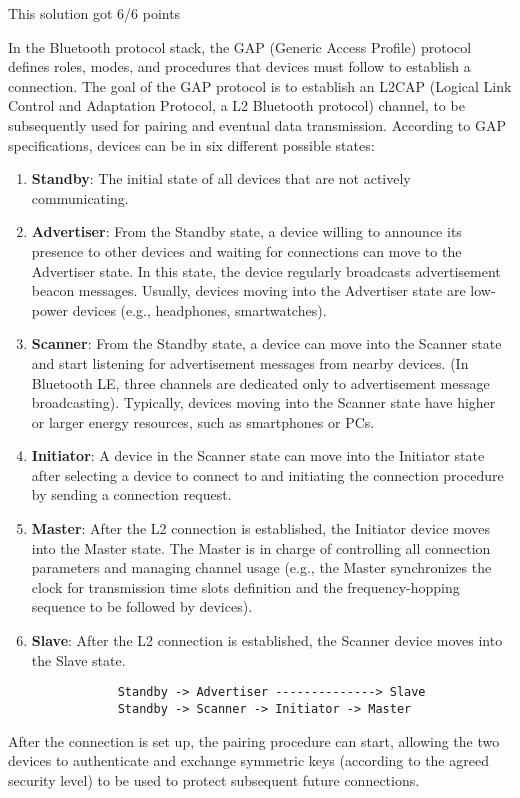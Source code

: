 \begin{solution}
    This solution got 6/6 points

    In the Bluetooth protocol stack, the GAP (Generic Access Profile) protocol defines roles, modes, and procedures that devices must follow to establish a connection. The goal of the GAP protocol is to establish an L2CAP (Logical Link Control and Adaptation Protocol, a L2 Bluetooth protocol) channel, to be subsequently used for pairing and eventual data transmission. According to GAP specifications, devices can be in six different possible states:
    \begin{enumerate}
        \item \textbf{Standby}: The initial state of all devices that are not actively communicating.
        \item \textbf{Advertiser}: From the Standby state, a device willing to announce its presence to other devices and waiting for connections can move to the Advertiser state. In this state, the device regularly broadcasts advertisement beacon messages. Usually, devices moving into the Advertiser state are low-power devices (e.g., headphones, smartwatches).
        \item \textbf{Scanner}: From the Standby state, a device can move into the Scanner state and start listening for advertisement messages from nearby devices. (In Bluetooth LE, three channels are dedicated only to advertisement message broadcasting). Typically, devices moving into the Scanner state have higher or larger energy resources, such as smartphones or PCs.
        \item \textbf{Initiator}: A device in the Scanner state can move into the Initiator state after selecting a device to connect to and initiating the connection procedure by sending a connection request.
        \item \textbf{Master}: After the L2 connection is established, the Initiator device moves into the Master state. The Master is in charge of controlling all connection parameters and managing channel usage (e.g., the Master synchronizes the clock for transmission time slots definition and the frequency-hopping sequence to be followed by devices).
        \item \textbf{Slave}: After the L2 connection is established, the Scanner device moves into the Slave state.
        \begin{verbatim}
            Standby -> Advertiser --------------> Slave
            Standby -> Scanner -> Initiator -> Master
        \end{verbatim}

    \end{enumerate}

    After the connection is set up, the pairing procedure can start, allowing the two devices to authenticate and exchange symmetric keys (according to the agreed security level) to be used to protect subsequent future connections.


\end{solution}


